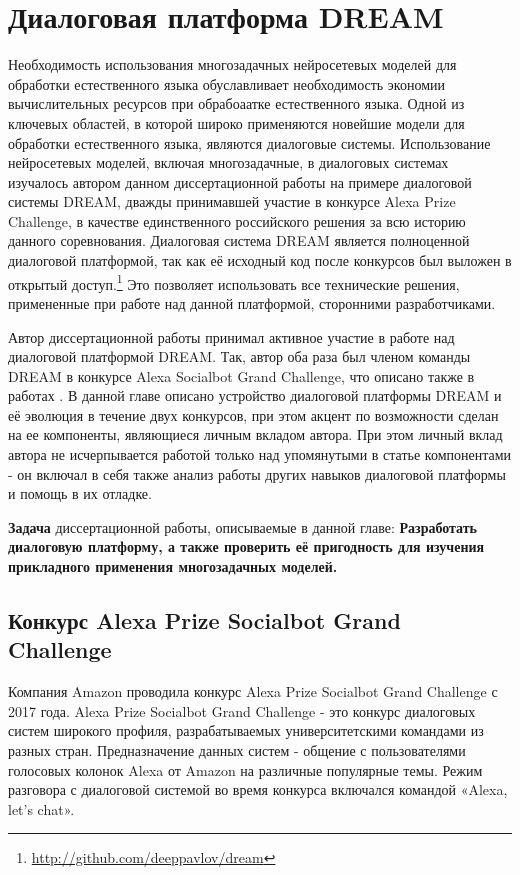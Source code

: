 
\chapter{Диалоговая платформа DREAM}\label{ch:dream} 
Необходимость использования многозадачных нейросетевых моделей для обработки естественного языка обуславливает необходимость экономии вычислительных ресурсов при обрабоаатке естественного языка. Одной из ключевых областей, в которой широко применяются новейшие модели для обработки естественного языка, являются диалоговые системы.  Использование нейросетевых моделей, включая многозадачные, в диалоговых системах изучалось автором данном диссертационной работы на примере диалоговой системы DREAM, дважды принимавшей участие в конкурсе Alexa Prize Challenge, в качестве единственного российского решения за всю историю данного соревнования. Диалоговая система {DREAM} является полноценной диалоговой платформой, так как её исходный код после конкурсов был выложен в открытый доступ.\footnote{\url{http://github.com/deeppavlov/dream}} Это позволяет использовать все технические решения, примененные при работе над данной платформой, сторонними разработчиками.

Автор диссертационной работы принимал активное участие в работе над диалоговой платформой DREAM. Так, автор оба раза был членом команды {DREAM} в конкурсе Alexa Socialbot Grand Challenge, что описано также в работах \cite{dream1,dream1_trudy,dream2}. В данной главе описано устройство диалоговой платформы {DREAM} и её эволюция в течение двух конкурсов, при этом акцент по возможности сделан на ее компоненты, являющиеся личным вкладом автора. При этом личный вклад автора не исчерпывается работой только над упомянутыми в статье компонентами - он включал в себя также анализ работы других навыков диалоговой платформы и помощь в их отладке.

\textbf{Задача} диссертационной работы, описываемые в данной главе: \textbf{Разработать диалоговую платформу, а также проверить её пригодность для изучения прикладного применения многозадачных моделей.}

\section{Конкурс Alexa Prize Socialbot Grand Challenge}

Компания Amazon проводила конкурс Alexa Prize Socialbot Grand Challenge с 2017 года. Alexa Prize Socialbot Grand Challenge - это конкурс диалоговых систем широкого профиля, разрабатываемых университетскими командами из разных стран. Предназначение данных систем - общение с пользователями голосовых колонок Alexa от Amazon на различные популярные темы. Режим разговора с диалоговой системой во время конкурса включался командой «Alexa, let’s chat».

